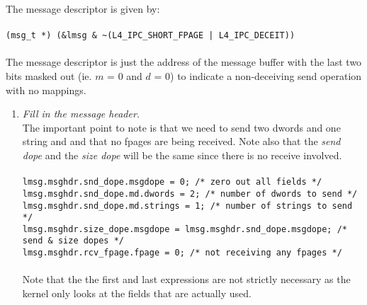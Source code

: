 \begin{enumerate}
  \hspace*{10pt} The message descriptor is given by: \\ \\
  \hspace*{20pt} {\footnotesize\verb+(msg_t *) (&lmsg & ~(L4_IPC_SHORT_FPAGE | L4_IPC_DECEIT))+} \\ \\
  \hspace*{10pt} The message descriptor is just the address of 
  the message buffer with the last two bits masked out (ie. $m$ =
  0 and $d$ = 0) to indicate a non-deceiving send 
  operation with no mappings.     

  \begin{enumerate}
    
  \item \emph{Fill in the message header.} \\
    
    \hspace*{10pt} The important point to note is that we need
    to send two dwords and one string and and that no fpages are 
    being received. Note also that the \emph{send dope} and the
    \emph{size dope} will be the same since there is no receive 
    involved.\\ \\
    \hspace*{20pt} {\footnotesize\verb+lmsg.msghdr.snd_dope.msgdope = 0; /* zero out all fields */+} \\ 
    \hspace*{20pt} {\footnotesize\verb+lmsg.msghdr.snd_dope.md.dwords = 2; /* number of dwords to send */+} \\
    \hspace*{20pt} {\footnotesize\verb+lmsg.msghdr.snd_dope.md.strings = 1; /* number of strings to send */+}\\
    \hspace*{20pt} {\footnotesize\verb+lmsg.msghdr.size_dope.msgdope = lmsg.msghdr.snd_dope.msgdope; /* send & size dopes */+}\\
    \hspace*{20pt} {\footnotesize\verb+lmsg.msghdr.rcv_fpage.fpage = 0; /* not receiving any fpages */+} \\ \\
    \hspace*{10pt} Note that the the first and last expressions are
    not strictly necessary as the kernel only looks at the
    fields that are actually used.  
    

\end{enumerate}
\end{enumerate}
